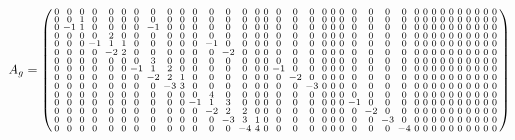 \documentclass[fleqn]{article}
\begin{document}
\begin{align}
    A_g = \spmqty{ 0 & 0 & 0 & 0 & 0 & 0 & 0 & 0 & 0 & 0 & 0 & 0 & 0 & 0 & 0 & 0 & 0 & 0 & 0 & 0 & 0 & 0 & 0 & 0 & 0 & 0 & 0 & 0 & 0 & 0 & 0 & 0 & 0 & 0 & 0 & 0 \\ 0 & 0 & 1 & 0 & 0 & 0 & 0 & 0 & 0 & 0 & 0 & 0 & 0 & 0 & 0 & 0 & 0 & 0 & 0 & 0 & 0 & 0 & 0 & 0 & 0 & 0 & 0 & 0 & 0 & 0 & 0 & 0 & 0 & 0 & 0 & 0 \\ 0 & -1 & 1 & 0 & 0 & 0 & 0 & -1 & 0 & 0 & 0 & 0 & 0 & 0 & 0 & 0 & 0 & 0 & 0 & 0 & 0 & 0 & 0 & 0 & 0 & 0 & 0 & 0 & 0 & 0 & 0 & 0 & 0 & 0 & 0 & 0 \\ 0 & 0 & 0 & 0 & 2 & 0 & 0 & 0 & 0 & 0 & 0 & 0 & 0 & 0 & 0 & 0 & 0 & 0 & 0 & 0 & 0 & 0 & 0 & 0 & 0 & 0 & 0 & 0 & 0 & 0 & 0 & 0 & 0 & 0 & 0 & 0 \\ 0 & 0 & 0 & -1 & 1 & 1 & 0 & 0 & 0 & 0 & 0 & -1 & 0 & 0 & 0 & 0 & 0 & 0 & 0 & 0 & 0 & 0 & 0 & 0 & 0 & 0 & 0 & 0 & 0 & 0 & 0 & 0 & 0 & 0 & 0 & 0 \\ 0 & 0 & 0 & 0 & -2 & 2 & 0 & 0 & 0 & 0 & 0 & 0 & -2 & 0 & 0 & 0 & 0 & 0 & 0 & 0 & 0 & 0 & 0 & 0 & 0 & 0 & 0 & 0 & 0 & 0 & 0 & 0 & 0 & 0 & 0 & 0 \\ 0 & 0 & 0 & 0 & 0 & 0 & 0 & 3 & 0 & 0 & 0 & 0 & 0 & 0 & 0 & 0 & 0 & 0 & 0 & 0 & 0 & 0 & 0 & 0 & 0 & 0 & 0 & 0 & 0 & 0 & 0 & 0 & 0 & 0 & 0 & 0 \\ 0 & 0 & 0 & 0 & 0 & 0 & -1 & 1 & 2 & 0 & 0 & 0 & 0 & 0 & 0 & 0 & -1 & 0 & 0 & 0 & 0 & 0 & 0 & 0 & 0 & 0 & 0 & 0 & 0 & 0 & 0 & 0 & 0 & 0 & 0 & 0 \\ 0 & 0 & 0 & 0 & 0 & 0 & 0 & -2 & 2 & 1 & 0 & 0 & 0 & 0 & 0 & 0 & 0 & -2 & 0 & 0 & 0 & 0 & 0 & 0 & 0 & 0 & 0 & 0 & 0 & 0 & 0 & 0 & 0 & 0 & 0 & 0 \\ 0 & 0 & 0 & 0 & 0 & 0 & 0 & 0 & -3 & 3 & 0 & 0 & 0 & 0 & 0 & 0 & 0 & 0 & -3 & 0 & 0 & 0 & 0 & 0 & 0 & 0 & 0 & 0 & 0 & 0 & 0 & 0 & 0 & 0 & 0 & 0 \\ 0 & 0 & 0 & 0 & 0 & 0 & 0 & 0 & 0 & 0 & 0 & 4 & 0 & 0 & 0 & 0 & 0 & 0 & 0 & 0 & 0 & 0 & 0 & 0 & 0 & 0 & 0 & 0 & 0 & 0 & 0 & 0 & 0 & 0 & 0 & 0 \\ 0 & 0 & 0 & 0 & 0 & 0 & 0 & 0 & 0 & 0 & -1 & 1 & 3 & 0 & 0 & 0 & 0 & 0 & 0 & 0 & 0 & 0 & -1 & 0 & 0 & 0 & 0 & 0 & 0 & 0 & 0 & 0 & 0 & 0 & 0 & 0 \\ 0 & 0 & 0 & 0 & 0 & 0 & 0 & 0 & 0 & 0 & 0 & -2 & 2 & 2 & 0 & 0 & 0 & 0 & 0 & 0 & 0 & 0 & 0 & -2 & 0 & 0 & 0 & 0 & 0 & 0 & 0 & 0 & 0 & 0 & 0 & 0 \\ 0 & 0 & 0 & 0 & 0 & 0 & 0 & 0 & 0 & 0 & 0 & 0 & -3 & 3 & 1 & 0 & 0 & 0 & 0 & 0 & 0 & 0 & 0 & 0 & -3 & 0 & 0 & 0 & 0 & 0 & 0 & 0 & 0 & 0 & 0 & 0 \\ 0 & 0 & 0 & 0 & 0 & 0 & 0 & 0 & 0 & 0 & 0 & 0 & 0 & -4 & 4 & 0 & 0 & 0 & 0 & 0 & 0 & 0 & 0 & 0 & 0 & -4 & 0 & 0 & 0 & 0 & 0 & 0 & 0 & 0 & 0 & 0 }
\end{align}
\end{document}
